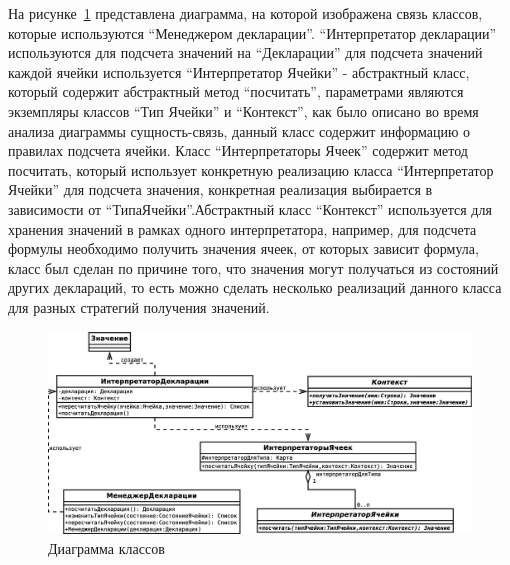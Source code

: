 \documentclass[14pt,a4paper]{reportmod}
\begin{document}
На рисунке~\ref{pic:classes_2} представлена диаграмма, на которой изображена связь классов, которые используются ``Менеджером декларации''. ``Интерпретатор декларации'' используются для подсчета значений на ``Декларации'' для подсчета значений каждой ячейки используется ``Интерпретатор Ячейки'' - абстрактный класс, который содержит абстрактный метод ``посчитать'', параметрами являются экземпляры классов ``Тип Ячейки'' и ``Контекст'', как было описано во время анализа диаграммы сущность-связь, данный класс содержит информацию о правилах подсчета ячейки. Класс ``Интерпретаторы Ячеек'' содержит метод посчитать, который использует конкретную реализацию класса ``Интерпретатор Ячейки'' для подсчета значения, конкретная реализация выбирается в зависимости от ``ТипаЯчейки''.Абстрактный класс ``Контекст'' используется для хранения значений в рамках одного интерпретатора, например, для подсчета формулы необходимо получить значения ячеек, от которых зависит формула, класс был сделан по причине того, что значения могут получаться из состояний других деклараций, то есть можно сделать несколько реализаций данного класса для разных стратегий получения значений.
\begin{figure}
  \centering
  \includegraphics[scale=0.3]{uml/classes_2}
  \caption{Диаграмма классов}
  \label{pic:classes_2}
\end{figure}
\end{document}
